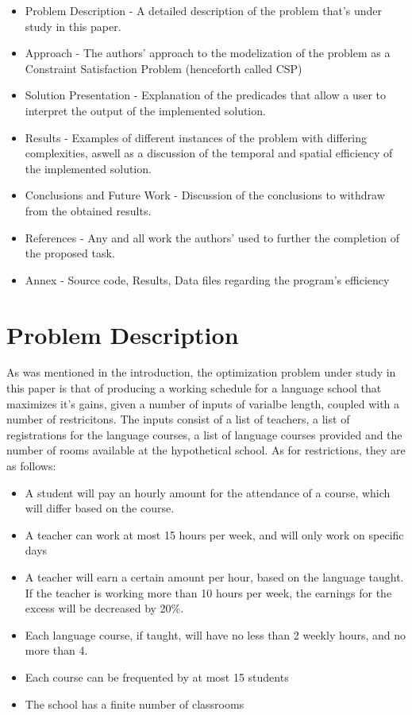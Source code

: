 \documentclass{llncs}
\begin{document}
\begin{itemize}
	\item Problem Description - A detailed description of the problem that's under study in this paper.
	\item Approach - The authors' approach to the modelization of the problem as a Constraint Satisfaction Problem (henceforth called CSP)
	\item Solution Presentation - Explanation of the predicades that allow a user to interpret the output of the implemented solution.
	\item Results - Examples of different instances of the problem with differing complexities, aswell as a discussion of the temporal and spatial efficiency of the implemented solution.
	\item Conclusions and Future Work - Discussion of the conclusions to withdraw from the obtained results.
	\item References - Any and all work the authors' used to further the completion of the proposed task.
	\item Annex - Source code, Results, Data files regarding the program's efficiency
\end{itemize}

\section{Problem Description}
As was mentioned in the introduction, the optimization problem under study in this paper is that of producing a working schedule for a language school that maximizes it's gains, given a number of inputs of varialbe length, coupled with a number of restricitons.  The inputs consist of a list of teachers, a list of registrations for the language courses, a list of language courses provided and the number of rooms available at the hypothetical school. As for restrictions, they are as follows:

\begin{itemize}
	\item A student will pay an hourly amount for the attendance of a course, which will differ based on the course.
	\item A teacher can work at most 15 hours per week, and will only work on specific days
	\item A teacher will earn a certain amount per hour, based on the language taught. If the teacher is working more than 10 hours per week, the earnings for the excess will be decreased by 20\%.
	\item Each language course, if taught, will have no less than 2 weekly hours, and no more than 4.
	\item Each course can be frequented by at most 15 students
	\item The school has a finite number of classrooms
\end{itemize}
\end{document}
